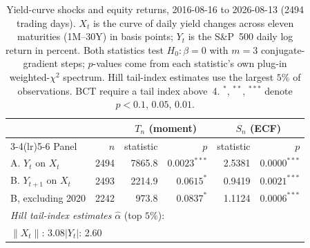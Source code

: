 \begin{table}[t]
\centering
\caption{Yield-curve shocks and equity returns, 2016-08-16 to 2026-08-13 (2494 trading days). $X_t$ is the curve of daily yield changes across eleven maturities (1M--30Y) in basis points; $Y_t$ is the S\&P~500 daily log return in percent. Both statistics test $H_0:\beta=0$ with $m=3$ conjugate-gradient steps; $p$-values come from each statistic's own plug-in weighted-$\chi^2$ spectrum. Hill tail-index estimates use the largest $5\%$ of observations. BCT require a tail index above~4. $^{*}$, $^{**}$, $^{***}$ denote $p<0.1$, $0.05$, $0.01$.}
\label{tab:empirical}
\begin{tabular}{l r rr rr}
\toprule
& & \multicolumn{2}{c}{$T_n$ (moment)} & \multicolumn{2}{c}{$S_n$ (ECF)} \\
\cmidrule(lr){3-4}\cmidrule(lr){5-6}
Panel & $n$ & statistic & $p$ & statistic & $p$ \\
\midrule
A. $Y_t$ on $X_t$ & 2494 & 7865.8 & $0.0023^{***}$ & 2.5381 & $0.0000^{***}$ \\
B. $Y_{t+1}$ on $X_t$ & 2493 & 2214.9 & $0.0615^{*}$ & 0.9419 & $0.0021^{***}$ \\
\addlinespace
\quad B, excluding 2020 & 2242 & 973.8 & $0.0837^{*}$ & 1.1124 & $0.0006^{***}$ \\
\midrule
\multicolumn{6}{l}{\emph{Hill tail-index estimates} $\hat\alpha$ (top $5\%$):}\\
\multicolumn{6}{l}{\quad $\lVert X_t\rVert$: 3.08\qquad $|Y_t|$: 2.60}\\
\bottomrule
\end{tabular}
\end{table}
